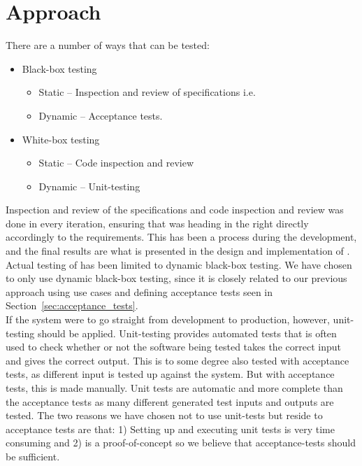 \section{Approach}
\label{sec:testing_approach}

There are a number of ways that \projectname{} can be tested:

\begin{itemize}
	\item Black-box testing
		\begin{itemize}
			\item Static -- Inspection and review of specifications i.e.
			\item Dynamic -- Acceptance tests.
		\end{itemize}

	\item White-box testing
		\begin{itemize}
			\item Static -- Code inspection and review
			\item Dynamic -- Unit-testing
		\end{itemize}
\end{itemize}

Inspection and review of the specifications and code inspection and review was done in every iteration, ensuring that \projectname{} was heading in the right directly accordingly to the requirements. 
This has been a process during the development, and the final results are what is presented in the design and implementation of \projectname{}.
Actual testing of \projectname{} has been limited to dynamic black-box testing.
We have chosen to only use dynamic black-box testing, since it is closely related to our previous approach using use cases and defining acceptance tests seen in Section~\ref{sec:acceptance_tests}.\\

If the system were to go straight from development to production, however, unit-testing should be applied.
Unit-testing provides automated tests that is often used to check whether or not the software being tested takes the correct input and gives the correct output. 
This is to some degree also tested with acceptance tests, as different input is tested up against the system. 
But with acceptance tests, this is made manually. 
Unit tests are automatic and more complete than the acceptance tests as many different generated test inputs and outputs are tested. 
The two reasons we have chosen not to use unit-tests but reside to acceptance tests are that: 1) Setting up and executing unit tests is very time consuming and 2) \projectname{} is a proof-of-concept so we believe that acceptance-tests should be sufficient.\\

